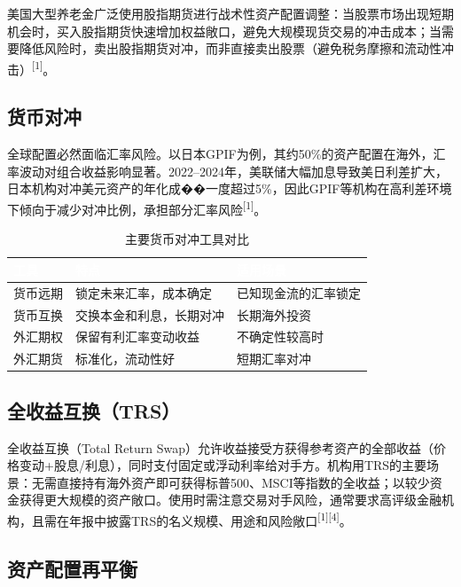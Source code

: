\documentclass[10pt,a4paper,twocolumn]{ctexart}
\begin{document}
美国大型养老金广泛使用股指期货进行战术性资产配置调整：当股票市场出现短期机会时，买入股指期货快速增加权益敞口，避免大规模现货交易的冲击成本；当需要降低风险时，卖出股指期货对冲，而非直接卖出股票（避免税务摩擦和流动性冲击）\textsuperscript{[1]}。

\subsection{货币对冲}

全球配置必然面临汇率风险。以日本GPIF为例，其约50\%的资产配置在海外，汇率波动对组合收益影响显著。2022--2024年，美联储大幅加息导致美日利差扩大，日本机构对冲美元资产的年化成��一度超过5\%，因此GPIF等机构在高利差环境下倾向于减少对冲比例，承担部分汇率风险\textsuperscript{[1]}。

\begin{table}[H]
\centering\scriptsize
\caption{主要货币对冲工具对比}
\label{tab:fx}
\renewcommand{\arraystretch}{1.25}
\setlength{\tabcolsep}{3pt}
\begin{tabularx}{\columnwidth}{@{}L{1.6cm}XX@{}}
\toprule
{}
\textcolor{white}{\textbf{工具}} &
\textcolor{white}{\textbf{特点}} &
\textcolor{white}{\textbf{适用场景}} \\
\midrule
货币远期 & 锁定未来汇率，成本确定 & 已知现金流的汇率锁定 \\
货币互换 & 交换本金和利息，长期对冲 & 长期海外投资 \\
外汇期权 & 保留有利汇率变动收益 & 不确定性较高时 \\
外汇期货 & 标准化，流动性好 & 短期汇率对冲 \\
\bottomrule
\end{tabularx}
\end{table}

\subsection{全收益互换（TRS）}

全收益互换（Total Return Swap）允许收益接受方获得参考资产的全部收益（价格变动+股息/利息），同时支付固定或浮动利率给对手方。机构用TRS的主要场景：无需直接持有海外资产即可获得标普500、MSCI等指数的全收益；以较少资金获得更大规模的资产敞口。使用时需注意交易对手风险，通常要求高评级金融机构，且需在年报中披露TRS的名义规模、用途和风险敞口\textsuperscript{[1][4]}。

\subsection{资产配置再平衡}
\end{document}
